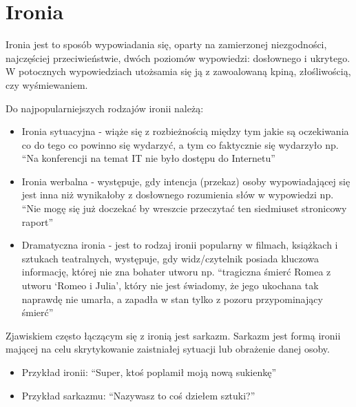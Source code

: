 \newpage %
\section{Ironia}

Ironia jest to sposób wypowiadania się, oparty na zamierzonej niezgodności, najczęściej przeciwieństwie, dwóch poziomów wypowiedzi: dosłownego i ukrytego. W potocznych wypowiedziach utożsamia się ją z zawoalowaną kpiną, złośliwością, czy wyśmiewaniem.



Do najpopularniejszych rodzajów ironii należą:
\begin{itemize}
    \item Ironia sytuacyjna - wiąże się z rozbieżnością między tym jakie są oczekiwania co do tego co powinno się wydarzyć, a tym co faktycznie się wydarzyło np. “Na konferencji na temat IT nie było dostępu do Internetu”
    \item Ironia werbalna - występuje, gdy intencja (przekaz) osoby wypowiadającej się jest inna niż wynikałoby z dosłownego rozumienia słów w wypowiedzi np. “Nie mogę się już doczekać by wreszcie przeczytać ten siedmiuset stronicowy raport”
    \item Dramatyczna ironia - jest to rodzaj ironii popularny w filmach, książkach i sztukach teatralnych, występuje, gdy widz/czytelnik posiada kluczowa informację, której nie zna bohater utworu np. “tragiczna śmierć Romea z utworu ‘Romeo i Julia’, który nie jest świadomy, że jego ukochana tak naprawdę nie umarła, a zapadła w stan tylko z pozoru przypominający śmierć”
\end{itemize}


Zjawiskiem często łączącym się z ironią jest sarkazm. Sarkazm jest formą ironii mającej na celu skrytykowanie zaistniałej sytuacji lub obrażenie danej osoby.
\begin{itemize}
    \item Przykład ironii: “Super, ktoś poplamił moją nową sukienkę”
    \item Przykład sarkazmu: “Nazywasz to coś dziełem sztuki?”
\end{itemize}



